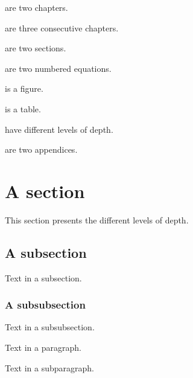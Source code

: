  are two chapters.

 are three consecutive chapters.

 are two sections.

 are two numbered equations.

 is a figure.

 is a table.

 have different levels of depth.

 are two appendices.

\section{A section}
\label{c3:s:a-section}

This section presents the different levels of depth.

\subsection{A subsection}
\label{c3:ss:a-subsection}

Text in a subsection.

\subsubsection{A subsubsection}

Text in a subsubsection.


Text in a paragraph.


Text in a subparagraph.
